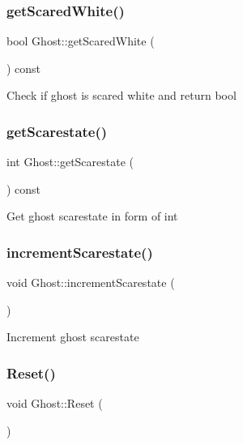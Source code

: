 \subsubsection{\texorpdfstring{get\+Scared\+White()}{getScaredWhite()}}
{\footnotesize\ttfamily bool Ghost\+::get\+Scared\+White (\begin{DoxyParamCaption}{ }\end{DoxyParamCaption}) const\hspace{0.3cm}{\ttfamily [inline]}}

Check if ghost is scared white and return bool \mbox{\label{class_ghost_a569122ead6a222f16e5603698b6b45e2}} 
\subsubsection{\texorpdfstring{get\+Scarestate()}{getScarestate()}}
{\footnotesize\ttfamily int Ghost\+::get\+Scarestate (\begin{DoxyParamCaption}{ }\end{DoxyParamCaption}) const\hspace{0.3cm}{\ttfamily [inline]}}

Get ghost scarestate in form of int \mbox{\label{class_ghost_a0fa6a3ef0c3f9e33f6271fb5d2db2e24}} 
\subsubsection{\texorpdfstring{increment\+Scarestate()}{incrementScarestate()}}
{\footnotesize\ttfamily void Ghost\+::increment\+Scarestate (\begin{DoxyParamCaption}{ }\end{DoxyParamCaption})\hspace{0.3cm}{\ttfamily [inline]}}

Increment ghost scarestate \mbox{\label{class_ghost_a51900002936b06acc029c845d9cb9240}} 
\subsubsection{\texorpdfstring{Reset()}{Reset()}}
{\footnotesize\ttfamily void Ghost\+::\+Reset (\begin{DoxyParamCaption}{ }\end{DoxyParamCaption})}

